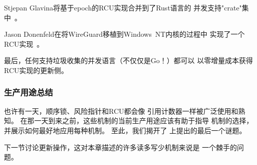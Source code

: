 Stjepan Glavina将基于epoch的RCU实现合并到了Rust语言的
并发支持"crate"集中~\cite{StjepanGlavina2018RustRCU}。

Jason Donenfeld在将WireGuard移植到Windows~NT内核的过程中
实现了一个RCU实现~\cite{JasonDonenfeld2021:WindowsNTwireguardRCU}。

最后，任何支持垃圾收集的并发语言（不仅仅是Go！\@）都可以
以零增量成本获得RCU实现的更新侧。

\subsubsection{生产用途总结}
\label{sec:defer:Summary of Production Uses}

也许有一天，顺序锁、风险指针和RCU都会像
引用计数器一样被广泛使用和熟知。
在那一天到来之前，这些机制的当前生产用途应该有助于指导
机制的选择，并展示如何最好地应用每种机制。
至此，我们揭开了
上提出的最后一个谜题。

下一节讨论更新操作，这对本章描述的许多读多写少机制来说是
一个棘手的问题。
